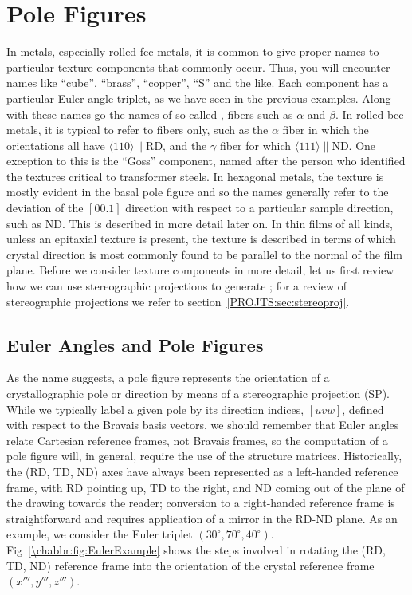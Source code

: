 \section{Pole Figures}\label{\chabbr:sec:PF}
In metals, especially rolled fcc metals, it is common to give proper names to particular texture components that commonly occur.  Thus, you will encounter names like  ``cube'', ``brass'', ``copper'', ``S'' and the like.  Each component has a particular Euler angle triplet, as we have seen in the previous examples.  Along with these names go the names of so-called , fibers such as $\alpha$ and $\beta$.  In rolled bcc metals, it is typical to refer to fibers only, such as the $\alpha$ fiber in which the orientations all have $\langle 110\rangle\parallel$RD, and the $\gamma$ fiber for which $\langle 111\rangle\parallel$ND.  One exception to this is the ``Goss'' component, named after the person who identified the textures critical to transformer steels.  In hexagonal metals, the texture is mostly evident in the basal pole figure and so the names generally refer to the deviation of the $[00.1]$ direction with respect to a particular sample direction, such as ND.  This is described in more detail later on.  In thin films of all kinds, unless an epitaxial texture is present, the texture is described in terms of which crystal direction is most commonly found to be parallel to the normal of the film plane.  Before we consider texture components in more detail, let us first review how we can use stereographic projections to generate ; for a review of stereographic projections we refer to section~\ref{PROJTS:sec:stereoproj}.

\subsection{Euler Angles and Pole Figures}\label{\chabbr:ssec:EulerPF}
As the name suggests, a pole figure represents the orientation of a crystallographic pole or direction by means of a stereographic projection (SP).  While we typically label a given pole by its direction indices, $[uvw]$, defined with respect to the Bravais basis vectors, we should remember that Euler angles relate Cartesian reference frames, not Bravais frames, so the computation of a pole figure will, in general, require the use of the structure matrices.  Historically, the (RD, TD, ND) axes have always been represented as a left-handed reference frame, with RD pointing up, TD to the right, and ND coming out of the plane of the drawing towards the reader; conversion to a right-handed reference frame is straightforward and requires application of a mirror in the RD-ND plane. As an example, we consider the Euler triplet $(30^{\circ},70^{\circ},40^{\circ})$. Fig~\ref{\chabbr:fig:EulerExample} shows the steps involved in rotating the (RD, TD, ND) reference frame into the orientation of the crystal reference frame $(x''', y''', z''')$. 

